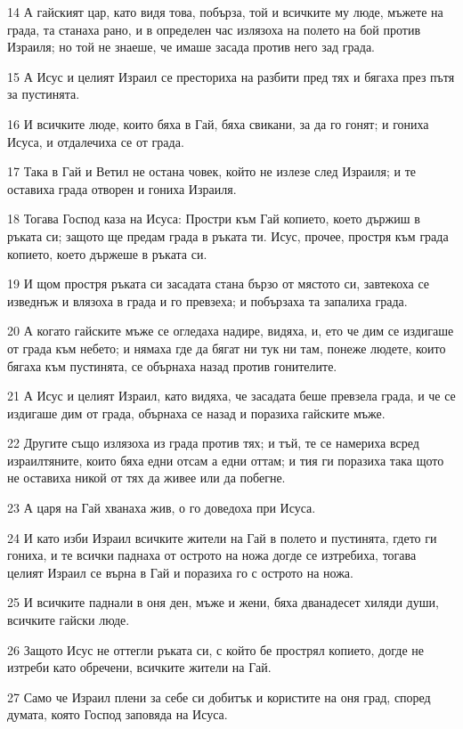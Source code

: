 \par 14 А гайският цар, като видя това, побърза, той и всичките му люде, мъжете на града, та станаха рано, и в определен час излязоха на полето на бой против Израиля; но той не знаеше, че имаше засада против него зад града.
\par 15 А Исус и целият Израил се престориха на разбити пред тях и бягаха през пътя за пустинята.
\par 16 И всичките люде, които бяха в Гай, бяха свикани, за да го гонят; и гониха Исуса, и отдалечиха се от града.
\par 17 Така в Гай и Ветил не остана човек, който не излезе след Израиля; и те оставиха града отворен и гониха Израиля.
\par 18 Тогава Господ каза на Исуса: Простри към Гай копието, което държиш в ръката си; защото ще предам града в ръката ти. Исус, прочее, простря към града копието, което държеше в ръката си.
\par 19 И щом простря ръката си засадата стана бързо от мястото си, завтекоха се изведнъж и влязоха в града и го превзеха; и побързаха та запалиха града.
\par 20 А когато гайските мъже се огледаха надире, видяха, и, ето че дим се издигаше от града към небето; и нямаха где да бягат ни тук ни там, понеже людете, които бягаха към пустинята, се обърнаха назад против гонителите.
\par 21 А Исус и целият Израил, като видяха, че засадата беше превзела града, и че се издигаше дим от града, обърнаха се назад и поразиха гайските мъже.
\par 22 Другите също излязоха из града против тях; и тъй, те се намериха всред израилтяните, които бяха едни отсам а едни оттам; и тия ги поразиха така щото не оставиха никой от тях да живее или да побегне.
\par 23 А царя на Гай хванаха жив, о го доведоха при Исуса.
\par 24 И като изби Израил всичките жители на Гай в полето и пустинята, гдето ги гониха, и те всички паднаха от острото на ножа догде се изтребиха, тогава целият Израил се върна в Гай и поразиха го с острото на ножа.
\par 25 И всичките паднали в оня ден, мъже и жени, бяха дванадесет хиляди души, всичките гайски люде.
\par 26 Защото Исус не оттегли ръката си, с който бе прострял копието, догде не изтреби като обречени, всичките жители на Гай.
\par 27 Само че Израил плени за себе си добитък и користите на оня град, според думата, която Господ заповяда на Исуса.
